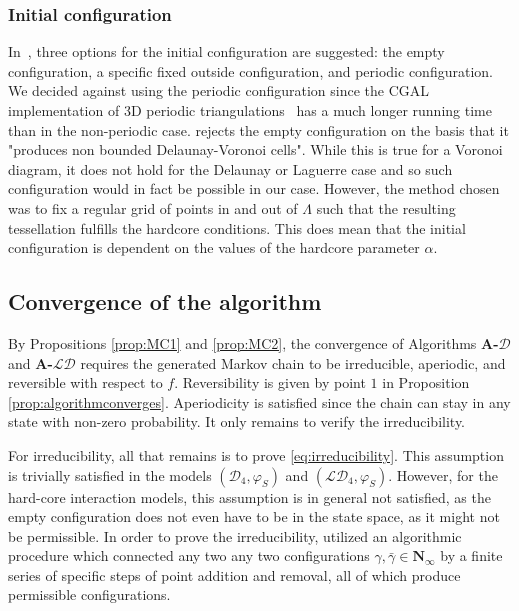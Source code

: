 \subsubsection{Initial configuration}
In~\cite{DereudreLavancier2011}, three options for the initial configuration are suggested: the empty configuration, a specific fixed outside configuration, and periodic configuration.
We decided against using the periodic configuration since the CGAL implementation of 3D periodic triangulations~\cite{cgal:3d-period} has a much longer running time than in the non-periodic case. 
\cite{DereudreLavancier2011} rejects the empty configuration on the basis that it "produces non bounded Delaunay-Voronoi cells". While this is true for a Voronoi diagram, it does not hold for the Delaunay or Laguerre case and so such configuration would in fact be possible in our case.
However, the method chosen was to fix a regular grid of points in and out of $\Lambda$ such that the resulting tessellation fulfills the hardcore conditions. This does mean that the initial configuration is dependent on the values of the hardcore parameter $\alpha$. 



\subsection{Convergence of the algorithm}
By Propositions \ref{prop:MC1} and \ref{prop:MC2}, the convergence of Algorithms \textbf{A-}$\mathcal D$ and \textbf{A-}$\mathcal {LD}$ requires the generated Markov chain to be irreducible, aperiodic, and reversible with respect to $f$. Reversibility is given by point $1$ in Proposition \ref{prop:algorithmconverges}. Aperiodicity is satisfied since the chain can stay in any state with non-zero probability. It only remains to verify the irreducibility.

For irreducibility, all that remains is to prove \eqref{eq:irreducibility}. This assumption is trivially satisfied in the models $(\mathcal D_4,\varphi_S)$ and $(\mathcal {LD}_4,\varphi_S)$. However, for the hard-core interaction models, this assumption is in general not satisfied, as the empty configuration does not even have to be in the state space, as it might not be permissible. In order to prove the irreducibility, \cite{DereudreLavancier2011} utilized an algorithmic procedure which connected any two any two configurations $\gamma,\bar\gamma \in \mathbf N_\infty$ by a finite series of specific steps of point addition and removal, all of which produce permissible configurations.

